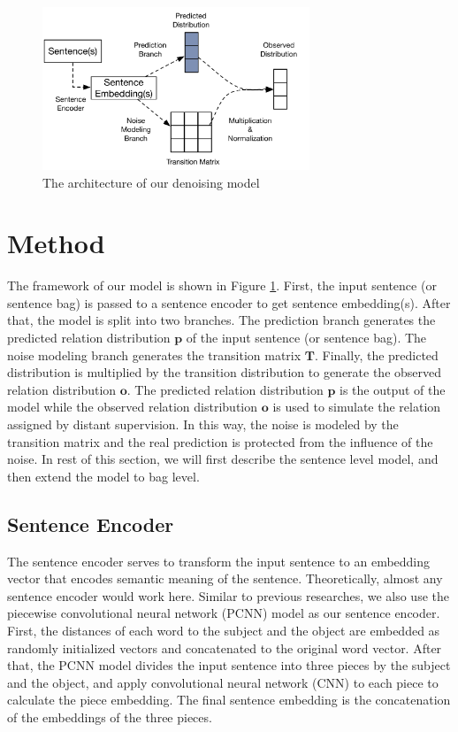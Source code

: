 
\begin{figure}[htbp]
\begin{center}
\includegraphics[width=8cm]{figures/denoise_framework.png}	
\caption{The architecture of our denoising model}
\label{fig: denoise_framework}
\end{center}
\end{figure}


\section{Method}
The framework of our model is shown in Figure \ref{fig: denoise_framework}. First, the input sentence (or sentence bag) is passed to a sentence encoder to get sentence embedding(s). After that, the model is split into two branches. The prediction branch generates the predicted relation distribution $\mathbf{p}$ of the input sentence (or sentence bag). The noise modeling branch generates the transition matrix $\mathbf{T}$. Finally, the predicted distribution is multiplied by the transition distribution to generate the observed relation distribution $\mathbf{o}$. The predicted relation distribution $\mathbf{p}$ is the output of the model while the observed relation distribution $\mathbf{o}$ is used to simulate the relation assigned by distant supervision. In this way, the noise is modeled by the transition matrix and the real prediction is protected from the influence of the noise. In rest of this section, we will first describe the sentence level model, and then extend the model to bag level.

\subsection{Sentence Encoder}
The sentence encoder serves to transform the input sentence to an embedding vector that encodes semantic meaning of the sentence. Theoretically, almost any sentence encoder would work here. Similar to previous researches, we also use the piecewise convolutional neural network (PCNN) model \cite{zeng2015distant} as our sentence encoder. First, the distances of each word to the subject and the object are embedded as randomly initialized vectors and concatenated to the original word vector. After that, the PCNN model divides the input sentence into three pieces by the subject and the object, and apply convolutional neural network (CNN) to each piece to calculate the piece embedding. The final sentence embedding is the concatenation of the embeddings of the three pieces.

